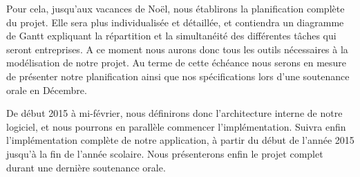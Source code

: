 		Pour cela, jusqu'aux vacances de Noël, nous établirons la planification complète du projet. Elle sera plus individualisée et détaillée, et contiendra un diagramme de Gantt expliquant la répartition et la simultanéité des différentes tâches qui seront entreprises.
		A ce moment nous aurons donc tous les outils nécessaires à la modélisation de notre projet.
		Au terme de cette échéance nous serons en mesure de présenter notre planification ainsi que nos spécifications lors d'une soutenance orale en Décembre.

		De début 2015 à mi-février, nous définirons donc l'architecture interne de notre logiciel, et nous pourrons en parallèle commencer l'implémentation.
		Suivra enfin l'implémentation complète de notre application, à partir du début de l'année 2015 jusqu'à la fin de l'année scolaire.
		Nous présenterons enfin le projet complet durant une dernière soutenance orale.

	    
